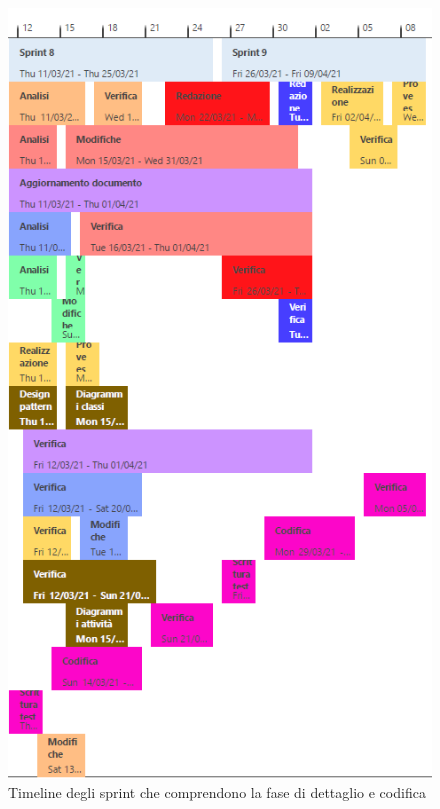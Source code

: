 \begin{figure}[H]
    \centering
    \includegraphics[scale = 0.5]{components/img/sprint8-9.png}
    \caption{Timeline degli sprint che comprendono la  fase di dettaglio e codifica}
    \label{fig:Timeline,sprint 8 e 9, fase di dettaglio e codifica}
\end{figure}

\newpage
